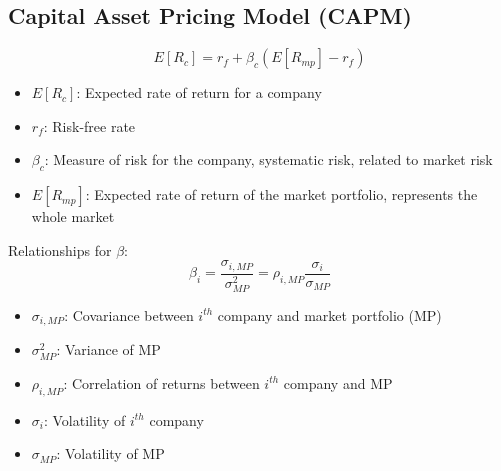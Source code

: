 \subsection{Capital Asset Pricing Model (CAPM)}
\begin{definition}
    \begin{equation}
        E[R_c] = r_f + \beta_c \left(E[R_{mp}] - r_f\right)
    \end{equation}
        
    \begin{itemize}
        \item $E[R_c]$: Expected rate of return for a company
        \item $r_f$: Risk-free rate
        \item $\beta_c$: Measure of risk for the company, systematic risk, related to market risk
        \item $E[R_{mp}]$: Expected rate of return of the market portfolio, represents the whole market
    \end{itemize}

    \vspace{1em}

    Relationships for $\beta$:
    \begin{equation}
        \beta_i = \frac{\sigma_{i, MP}}{\sigma^2_{MP}} = \rho_{i, MP} \frac{\sigma_i}{\sigma_{MP}}
    \end{equation}
    
    \begin{itemize}
        \item $\sigma_{i, MP}$: Covariance between $i^{th}$ company and market portfolio (MP)
        \item $\sigma^2_{MP}$: Variance of MP
        \item $\rho_{i, MP}$: Correlation of returns between $i^{th}$ company and MP
        \item $\sigma_i$: Volatility of $i^{th}$ company
        \item $\sigma_{MP}$: Volatility of MP
    \end{itemize}
\end{definition}

